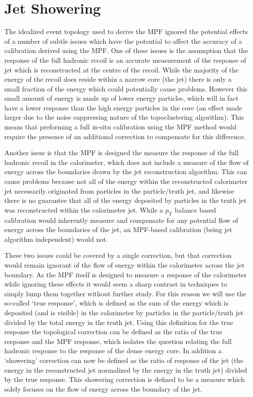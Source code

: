 \section{Jet Showering}
\label{sec:ShoweringIntro}
The idealized event topology used to derive the MPF ignored the potential effects of a number of subtle issues which have the potential to affect the accuracy of a calibration derived using the MPF.
One of these issues is the assumption that the response of the full hadronic recoil is an accurate measurement of the response of jet which is reconstructed at the centre of the recoil.
While the majority of the energy of the recoil does reside within a narrow core (the jet) there is only a small fraction of the energy which could potentially cause problems.
However this small amount of energy is made up of lower energy particles, which will in fact have a lower response than the high energy particles in the core (an effect made larger due to the noise suppressing nature of the topoclustering algorithm).
This means that preforming a full {\textit in-situ} calibration using the MPF method would require the presence of an additional correction to compensate for this difference.

Another issue is that the MPF is designed the measure the response of the full hadronic recoil in the calorimeter, which does not include a measure of the flow of energy across the boundaries drawn by the jet reconstruction algorithm.
This can cause problems because not all of the energy within the reconstructed calorimeter jet necessarily originated from particles in the particle/truth jet, and likewise there is no guarantee that all of the energy deposited by particles in the truth jet was reconstructed within the calorimeter jet.
While a $p_{\mathrm T}$ balance based calibration would inherently measure and compensate for any potential flow of energy across the boundaries of the jet, an MPF-based calibration (being jet algorithm independent) would not.

These two issues could be covered by a single correction, but that correction would remain ignorant of the flow of energy within the calorimeter across the jet boundary.
As the MPF itself is designed to measure a response of the calorimeter while ignoring these effects it would seem a sharp contrast in techniques to simply lump them together without further study.
For this reason we will use the so-called `true response', which is defined as the sum of the energy which is deposited (and is visible) in the calorimeter by particles in the particle/truth jet divided by the total energy in the truth jet.
Using this definition for the true response the topological correction can be defined as the ratio of the true response and the MPF response, which isolates the question relating the full hadronic response to the response of the dense energy core.
In addition a `showering' correction can now be defined as the ratio of response of the jet (the energy in the reconstructed jet normalized by the energy in the truth jet) divided by the true response.
This showering correction is defined to be a measure which solely focuses on the flow of energy across the boundary of the jet.


